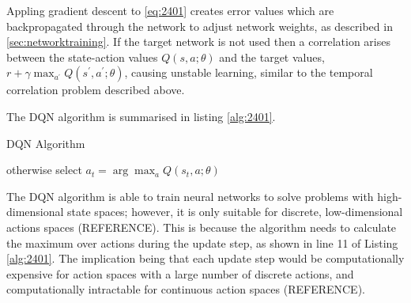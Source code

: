 Appling gradient descent to \ref{eq:2401} creates error values which are backpropagated through the network to adjust network weights, as described in \textsection \ref{sec:networktraining}. If the target network is not used then a correlation arises between the state-action values $Q(s,a; \theta)$ and the target values, $r + \gamma \max_{a^\prime} Q(s^\prime,a^\prime; \theta)$, causing unstable learning, similar to the temporal correlation problem described above.

The DQN algorithm is summarised in listing \ref{alg:2401}.

\begin{algorithm}[h]
	\caption{DQN Algorithm}
	\begin{algorithmic}[1]
				 otherwise select $a_t = \arg\max_a Q(s_t, a; \theta)$
			\EndFor
		\EndFor
	\end{algorithmic}\label{alg:2401}
\end{algorithm}

The DQN algorithm is able to train neural networks to solve problems with high-dimensional state spaces; however, it is only suitable for discrete, low-dimensional actions spaces (REFERENCE). This is because the algorithm needs to calculate the maximum over actions during the update step, as shown in line 11 of Listing \ref{alg:2401}. The implication being that each update step would be computationally expensive for action spaces with a large number of discrete actions, and computationally intractable for continuous action spaces (REFERENCE).

